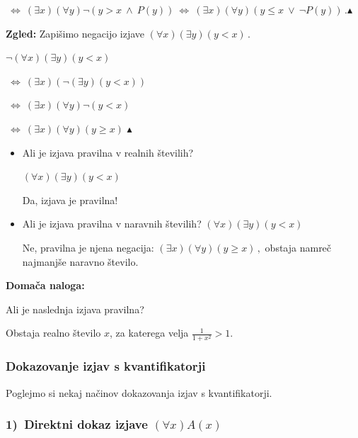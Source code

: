 \documentclass[11pt,paper=b5,footinclude,headinclude]{scrbook} %
\def\ali {{~\vee~}}
\def\inn {{~\wedge~}}
\def\cee {{~\Leftrightarrow~}}
\def\zgled{\noindent\textbf{\color{blue} Zgled: }}
\def\kz{{\hfill{\color{blue}$\blacktriangle$}}}%
\begin{document}
  $\cee(\exists  x)(\forall  y)\neg (y>x\inn P(y))\cee(\exists  x)(\forall  y)(y\le x\ali \neg P(y))\,.$\kz

\bigskip
\zgled
Zapišimo negacijo izjave
  $(\forall x)(\exists y)(y<x)\,.$

  $\neg(\forall x)(\exists y)(y<x)$

  $\cee (\exists x)(\neg(\exists y)(y<x))$

  $\cee (\exists x)(\forall y)\neg(y<x)$

  $\cee (\exists x)(\forall y)(y\ge x)$
  \kz

\begin{itemize}
  \item Ali je izjava pravilna v realnih številih?

  $(\forall x)(\exists y)(y<x)$

  Da, izjava je pravilna!

  \item Ali je izjava pravilna v naravnih številih?
  $(\forall x)(\exists y)(y<x)$

Ne, pravilna je njena negacija:
$(\exists x)(\forall y)(y\ge x)\,,$
obstaja namreč najmanjše naravno število.
\end{itemize}

\textbf{ Domača naloga:}

Ali je naslednja izjava pravilna?

Obstaja realno število $x$, za katerega velja $\frac{1}{1+x^2}>1$.

%
%
%
%
%
%
%


\subsubsection{Dokazovanje izjav s kvantifikatorji}

Poglejmo si nekaj načinov dokazovanja izjav s kvantifikatorji.

\subsubsection*{1)~Direktni dokaz izjave $(\forall x)A(x)$}
\end{document}
